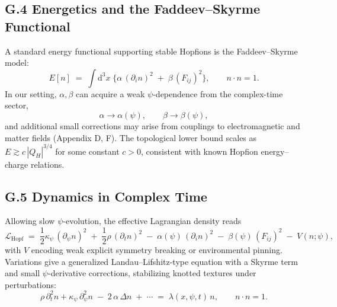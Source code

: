 \subsection*{G.4 Energetics and the Faddeev--Skyrme Functional}
A standard energy functional supporting stable Hopfions is the Faddeev--Skyrme model:
\begin{equation}
E[n] \;=\; \int\! \mathrm{d}^3x \;\Big\{ \alpha\, (\partial_i n)^2 \;+\; \beta\, (F_{ij})^2 \Big\},\qquad n\cdot n=1.
\end{equation}
In our setting, $\alpha,\beta$ can acquire a weak $\psi$-dependence from the complex-time sector,
\begin{equation}
\alpha \to \alpha(\psi),\qquad \beta \to \beta(\psi),
\end{equation}
and additional small corrections may arise from couplings to electromagnetic and matter fields (Appendix D, F). 
The topological lower bound scales as $E \gtrsim c\, |Q_H|^{3/4}$ for some constant $c>0$, consistent with known Hopfion energy--charge relations.

\subsection*{G.5 Dynamics in Complex Time}
Allowing slow $\psi$-evolution, the effective Lagrangian density reads
\begin{equation}
\mathcal{L}_{\mathrm{Hopf}} \;=\; \frac{1}{2} \kappa_\psi \, (\partial_\psi n)^2 \;+\; \frac{1}{2}\rho \, (\partial_t n)^2 \;-\; \alpha(\psi)\, (\partial_i n)^2 \;-\; \beta(\psi)\, (F_{ij})^2 \;-\; V(n;\psi),
\end{equation}
with $V$ encoding weak explicit symmetry breaking or environmental pinning. 
Variations give a generalized Landau--Lifshitz-type equation with a Skyrme term and small $\psi$-derivative corrections, stabilizing knotted textures under perturbations:
\begin{equation}
\rho\, \partial_t^2 n + \kappa_\psi\, \partial_\psi^2 n \;-\; 2\,\alpha \,\Delta n \;+\; \cdots \;=\; \lambda(x,\psi,t)\, n,\qquad n\cdot n=1.
\end{equation}

